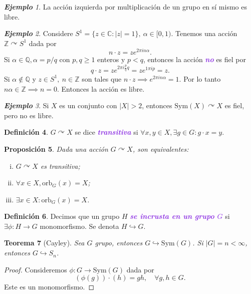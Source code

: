 \documentclass{article}
\newtheorem{theorem}{Teorema}[subsection]
\newtheorem{proposition}[theorem]{Proposición}
\theoremstyle{definition}
\newtheorem{definition}[theorem]{Definición}
\theoremstyle{remark}
\newtheorem{example}[theorem]{\textbf{Ejemplo}}
\numberwithin{equation}{section}
\newcommand{\C}{\mathbb{C}}
\newcommand{\Q}{\mathbb{Q}}
\newcommand{\Z}{\mathbb{Z}}
\newcommand{\oo}{\infty}
\newcommand{\embed}{\hookrightarrow}
\newcommand{\acts}{\curvearrowright}
\renewcommand{\c}{\cdot}
\newcommand{\orb}{\mathrm{orb}}
\newcommand{\Sym}{\mathrm{Sym}}
\newcommand{\abs}[1]{\left| #1 \right|}
\newcommand{\wea}[1]{\textcolor{BlueViolet}{\textbf{\emph{#1}}}}
\begin{document}
\begin{example}
  La acción izquierda por multiplicación de un grupo en sí mismo es libre.
\end{example}

\begin{example}
  Considere $S^1 = \{z \in \C \colon \abs z = 1\}, \ \alpha \in [0,1)$. Tenemos una acción $\Z \acts S^1$ dada por $$n \c z = z e^{2\pi in\alpha}.$$
  Si $\alpha \in \Q, \alpha = p/q$ con $p,q \geq 1$ enteros y $p < q$, entonces la acción \wea{no} es fiel por
  \[q \c z = ze^{2\pi i \frac{p}{q} q} = ze^{1\pi i p} = z.\]
  Si $\alpha \notin \Q$ y $z \in S^1, \ n \in \Z$ son tales que $n \c z \implies e^{2\pi i n \alpha} = 1$. Por lo tanto $n\alpha \in \Z \implies n=0$. Entonces la acción es libre.
\end{example}

\begin{example}
  Si $X$ es un conjunto con $\abs X > 2$, entonces $\Sym(X) \acts X$ es fiel, pero no es libre.
\end{example}

\begin{definition}
  $G \acts X$ se dice \wea{transitiva} si $\forall x,y \in X, \exists g \in G \colon g\c x = y$.
\end{definition}

\begin{proposition}
  Dada una acción $G \acts X$, son equivalentes:
  \begin{enumerate}[(i)]
    \item $G \acts X$ es transitiva;
    \item $\forall x \in X, \orb_G(x) = X$;
    \item $\exists x \in X \colon \orb_G(x) = X$.
  \end{enumerate}
\end{proposition}

\begin{definition}
  Decimos que un grupo $H$ \wea{se incrusta en un grupo $G$} si $\exists \phi \colon H \to G$ monomorfismo. Se denota $H \embed G$.
\end{definition}

\begin{theorem}
  [Cayley]
  Sea $G$ grupo, entonces $G \embed \Sym(G)$. Si $\abs G = n < \oo$, entonces $G \embed S_n$.
\end{theorem}
\begin{proof}
  Consideremos $\phi \colon G \to \Sym(G)$ dada por $$(\phi(g))\c(h) = gh, \quad \forall g,h \in G.$$
  Este es un monomorfismo.
\end{proof}
\end{document}
